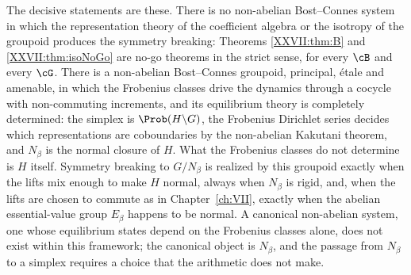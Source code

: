 The decisive statements are these. There is no non-abelian Bost--Connes system in which
the representation theory of the coefficient algebra or the isotropy of the groupoid
produces the symmetry breaking: Theorems \ref{XXVII:thm:B} and \ref{XXVII:thm:isoNoGo} are no-go
theorems in the strict sense, for every $\cB$ and every $\cG$. There is a non-abelian
Bost--Connes groupoid, principal, \'etale and amenable, in which the Frobenius classes
drive the dynamics through a cocycle with non-commuting increments, and its equilibrium
theory is completely determined: the simplex is $\Prob(H\backslash G)$, the Frobenius
Dirichlet series decides which representations are coboundaries by the non-abelian
Kakutani theorem, and $N_\beta$ is the normal closure of $H$. What the Frobenius classes do
not determine is $H$ itself. Symmetry breaking to $G/N_\beta$ is realized by this groupoid
exactly when the lifts mix enough to make $H$ normal, always when $N_\beta$ is rigid, and,
when the lifts are chosen to commute as in Chapter~\ref{ch:VII}, exactly when the abelian
essential-value group $E_\beta$ happens to be normal. A canonical
non-abelian system, one whose equilibrium states depend on the Frobenius classes alone,
does not exist within this framework; the canonical object is $N_\beta$, and the passage
from $N_\beta$ to a simplex requires a choice that the arithmetic does not make.

